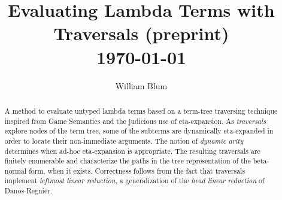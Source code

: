 \documentclass{elsarticle}
\author{William Blum}
\title{Evaluating Lambda Terms with Traversals (preprint)
\\ \vspace*{1em}
\today}
\makeatletter
\theoremstyle{plain}
\theoremstyle{definition}
\def\etal{\textit{et al.}\@\xspace}
\makeatother
\begin{document}





\begin{abstract}
    A method to evaluate untyped lambda terms based on a term-tree traversing technique inspired from Game Semantics and the judicious use of eta-expansion.
    As \emph{traversals} explore nodes of the term tree,
    some of the subterms are dynamically eta-expanded in order to locate their non-immediate arguments.
    The notion of \emph{dynamic arity} determines when ad-hoc eta-expansion is appropriate.
    The resulting traversals are finitely enumerable and characterize the paths in the tree representation of the beta-normal form, when it exists.
    Correctness follows from the fact that traversals implement \emph{leftmost linear reduction}, a generalization of the \emph{head linear reduction} of Danos-Regnier.
\end{abstract}
\end{document}
